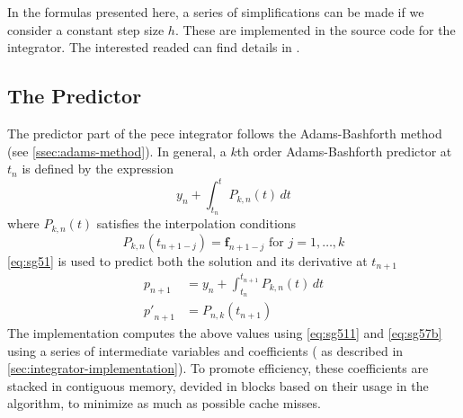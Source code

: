 In the formulas presented here, a series of simplifications can be made if we 
consider a constant step size $h$. These are implemented in the source code for 
the integrator. The interested readed can find details in \cite{Shampine1975}.

\iffalse
\cite{Shampine1975}:
The overhead in these codes is rather high, partly because of the methods
and partly because of the features they provide. For example, DE detects
and deals with discontinuities; it detects and deals with moderate stiffness;
it detects and tells the user of severe stiffness; it detects requests for very
high accuracy and switches on propagated roundoff controls; it detects
requests for more accuracy than is possible on the machine being used and
tells the user what is possible; it is, for practical purposes, independent
of the number and location of output points; it monitors the work being
expended; it allows the user to change direction without restarting; and
it is extremely efficient in terms of function evaluations. 
\fi

\subsection{The Predictor}\label{ssec:integrator-predictor}
The predictor part of the \gls{pece} integrator follows the Adams-Bashforth 
method (see \autoref{ssec:adams-method}). In general, a $k$th order Adams-Bashforth 
predictor at $t_n$ is defined by the expression 
\begin{equation}\label{eq:sg51}
  y_n + \int_{t_n}^{t} P_{k,n}(t) \,dt
\end{equation}
where $P_{k,n}(t)$ satisfies the interpolation conditions
\begin{equation}\label{eq:sg51b}
  P_{k,n}(t_{n+1-j}) = \bm{f}_{n+1-j} \text{ for } j=1,\dots ,k
\end{equation}
\autoref{eq:sg51} is used to predict both the solution and its derivative at 
$t_{n+1}$
\begin{align}
  p_{n+1}    &= y_n + \int_{t_n}^{t_{n+1}}  P_{k,n} (t) \,dt \label{eq:sg52a}\\
  {p'}_{n+1} &= P_{n,k}(t_{n+1}) \label{eq:sg52b}
\end{align}
The implementation computes the above values using \autoref{eq:sg511} and 
\autoref{eq:sg57b} using a series of intermediate variables and coefficients (
as described in \autoref{sec:integrator-implementation}). To promote efficiency, 
these coefficients are stacked in contiguous memory, devided in blocks based on 
their usage in the algorithm, to minimize as much as possible cache misses.

